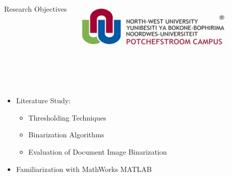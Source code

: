 \documentclass[11pt]{beamer}
\begin{document}
	
	\begin{frame}[t]
		\begin{columns}[onlytextwidth]
				\begin{Large}
					\vspace{-0.2cm}
					\color{beamer@maroon}Research Objectives
				\end{Large}
				\includegraphics[scale=0.4]{nwulogo.jpeg}
		\end{columns}
		\hspace{0.1cm}
		\newline
		\noindent\makebox[\linewidth]{\rule{\paperwidth}{0.4pt}}\\
		[1cm]
		\begin{columns}[onlytextwidth]
				\begin{itemize}
					\item Literature Study:
					\begin{itemize}
						\item Thresholding Techniques
						\item Binarization Algorithms
						\item Evaluation of Document Image Binarization
					\end{itemize}
					\item<2-> Familiarization with MathWorks MATLAB
				\end{itemize}
				\vspace{-0.7cm}

\end{columns}
\end{frame}
\end{document}
